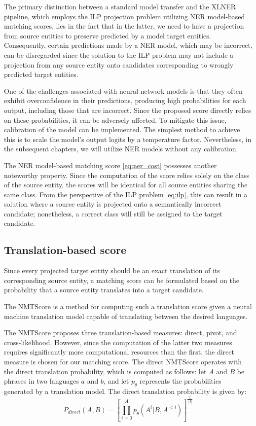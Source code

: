 The primary distinction between a standard model transfer and the XLNER pipeline,
which employs the ILP projection problem utilizing NER model-based matching scores,
lies in the fact that in the latter, we need to have a projection from source entities to preserve
predicted by a model target entities.
Consequently, certain predictions made by a NER model, which may be incorrect,
can be disregarded since the solution to the ILP problem may not include a projection from
any source entity onto candidates corresponding to wrongly predicted
target entities.

One of the challenges associated with neural network models is that they often exhibit
overconfidence in their predictions, producing high probabilities for each output,
including those that are incorrect. Since the proposed score directly relies on
these probabilities, it can be adversely affected. To mitigate this issue, calibration \cite{pmlr-v70-guo17a}
of the model can be implemented. The simplest method to achieve this is to scale
the model's output logits by a temperature factor. Nevertheless, in the subsequent chapters,
we will utilize NER models without any calibration.

The NER model-based matching score \eqref{eq:ner_cost} possesses another noteworthy
property. Since the computation of the score relies solely on the class of the source
entity, the scores will be identical for all source entities sharing the same class.
From the perspective of the ILP problem \eqref{eq:ilp}, this can result in a solution
where a source entity is projected onto a semantically incorrect candidate;
nonetheless, a correct class will still be assigned to the target candidate.

\subsection{Translation-based score}

Since every projected target entity should be an exact translation of its corresponding
source entity, a matching score can be formulated based on the probability that a
source entity translates into a target candidate.

The NMTScore \cite{vamvas_sennrich_2022_nmtscore} is a method for computing such a
translation score given a neural machine translation model capable of translating
between the desired languages.

The NMTScore proposes three translation-based measures: direct, pivot, and cross-likelihood.
However, since the computation of the latter two measures requires significantly more
computational resources than the first, the direct measure is chosen for our matching
score. The direct NMTScore operates with the direct
translation probability, which is computed as follows: let \( A \) and \( B \) be
phrases in two languages \( a \) and \( b \), and let \( p_{\theta} \)
represents the probabilities generated by a translation model. The direct translation
probability is given by:
\[
  P_{direct}(A, B) = \left[ \prod\limits_{t=0}^{|A|} p_{\theta}(A^i|B, A^{<i}) \right]^{\frac{1}{|A|}}
\]

